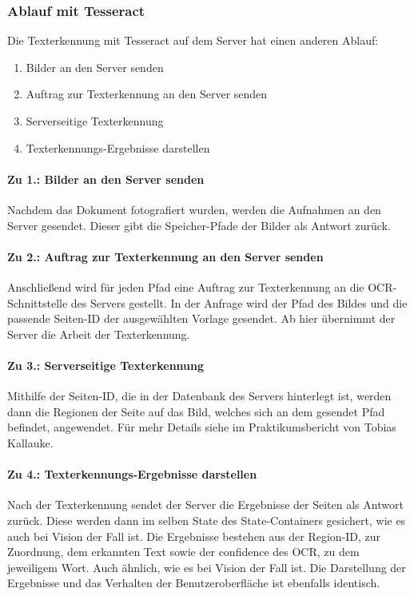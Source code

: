 \documentclass[notables, nomenclature, oneside, 150]{HSMW-Thesis}
\begin{document}
			\subsubsection*{Ablauf mit Tesseract}
				Die Texterkennung mit Tesseract auf dem Server hat einen anderen Ablauf:
				\vspace{-5mm}
				\begin{enumerate}
					\item Bilder an den Server senden
					\item Auftrag zur Texterkennung an den Server senden
					\item Serverseitige Texterkennung
					\item Texterkennungs-Ergebnisse darstellen
				\end{enumerate}
				
				\paragraph*{Zu 1.: Bilder an den Server senden}
				Nachdem das Dokument fotografiert wurden, werden die Aufnahmen an den Server gesendet. Dieser gibt die Speicher-Pfade der Bilder als Antwort zurück. 
				
				\paragraph*{Zu 2.: Auftrag zur Texterkennung an den Server senden}
				Anschließend wird für jeden Pfad eine Auftrag zur Texterkennung an  die OCR-Schnittstelle des Servers gestellt. In der Anfrage wird der Pfad des Bildes und die passende Seiten-ID der ausgewählten Vorlage gesendet. Ab hier übernimmt der Server die Arbeit der Texterkennung.
				
				\paragraph*{Zu 3.: Serverseitige Texterkennung}
				Mithilfe der Seiten-ID, die in der Datenbank des Servers hinterlegt ist, werden dann die Regionen der Seite auf das Bild, welches sich an dem gesendet Pfad befindet, angewendet. Für mehr Details siehe im Praktikumsbericht von Tobias Kallauke. 
				
				\paragraph*{Zu 4.: Texterkennungs-Ergebnisse darstellen}
				Nach der Texterkennung sendet der Server die Ergebnisse der Seiten als Antwort zurück. Diese werden dann im selben State des State-Containers gesichert, wie es auch bei Vision der Fall ist. Die Ergebnisse bestehen aus der Region-ID, zur Zuordnung, dem erkannten Text sowie der confidence des OCR, zu dem jeweiligem Wort. Auch ähnlich, wie es bei Vision der Fall ist. Die Darstellung der Ergebnisse und das Verhalten der Benutzeroberfläche ist ebenfalls identisch.      
\end{document}
